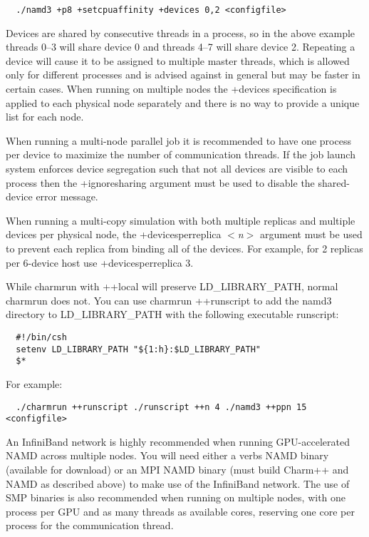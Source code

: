 \begin{verbatim}
  ./namd3 +p8 +setcpuaffinity +devices 0,2 <configfile>
\end{verbatim}

Devices are shared by consecutive threads in a process, so in the
above example threads 0--3 will share device 0 and threads 4--7 will
share device 2.  Repeating a device will cause it to be assigned to
multiple master threads, which is allowed only for different processes
and is advised against in general but may be faster in certain cases.
When running on multiple nodes the +devices specification is applied to
each physical node separately and there is no way to provide a unique
list for each node.

When running a multi-node parallel job it is recommended to have one
process per device to maximize the number of communication threads.
If the job launch system enforces device segregation such that not all
devices are visible to each process then the +ignoresharing argument
must be used to disable the shared-device error message.

When running a multi-copy simulation with both multiple replicas and
multiple devices per physical node, 
the +devicesperreplica $<${\em n}$>$ argument
must be used to prevent each replica from binding all of the devices.
For example, for 2 replicas per 6-device host use +devicesperreplica 3.

While charmrun with ++local will preserve LD\_LIBRARY\_PATH, normal
charmrun does not.  You can use charmrun ++runscript to add the namd3
directory to LD\_LIBRARY\_PATH with the following executable runscript:

\begin{verbatim}
  #!/bin/csh
  setenv LD_LIBRARY_PATH "${1:h}:$LD_LIBRARY_PATH"
  $*
\end{verbatim}

For example:

\begin{verbatim}
  ./charmrun ++runscript ./runscript ++n 4 ./namd3 ++ppn 15 <configfile>
\end{verbatim}

An InfiniBand network is highly recommended when running GPU-accelerated
NAMD across multiple nodes.  You will need either a verbs NAMD binary
(available for download) or an MPI NAMD binary (must build Charm++ and
NAMD as described above) to make use of the InfiniBand network.  The use
of SMP binaries is also recommended when running on multiple nodes, with
one process per GPU and as many threads as available cores, reserving
one core per process for the communication thread.

